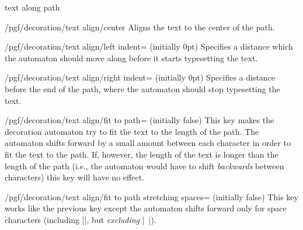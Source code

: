 \begin{decoration}{text along path}
    \begin{stylekey}{/pgf/decoration/text align/center}
        Aligns the text to the center of the path.
    \end{stylekey}

    \begin{key}{/pgf/decoration/text align/left indent= (initially 0pt)}
        Specifies a distance which the automaton should move along before it
        starts typesetting the text.
    \end{key}

    \begin{key}{/pgf/decoration/text align/right indent= (initially 0pt)}
        Specifies a distance before the end of the path, where the automaton
        should stop typesetting the text.
    \end{key}

    \begin{key}{/pgf/decoration/text align/fit to path= (initially false)}
        This key makes the decoration automaton try to fit the text to the
        length of the path. The automaton shifts forward by a small amount
        between each character in order to fit the text to the path. If,
        however, the length of the text is longer than the length of the path
        (i.e., the automaton would have to shift \emph{backwards} between
        characters) this key will have no effect.
\begin{codeexample}[]
\end{codeexample}
    \end{key}

    \begin{key}{/pgf/decoration/text align/fit to path stretching spaces= (initially false)}
        This key works like the previous key except the automaton shifts
        forward only for space characters (including |\space|, but
        \emph{excluding} |\ |).
\begin{codeexample}[]
\end{codeexample}
    \end{key}
\end{decoration}

